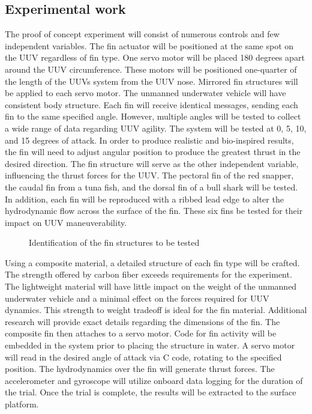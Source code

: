 \documentclass{IEEEtran}
\begin{document}
\subsection{Experimental work}
The proof of concept experiment will consist of numerous controls and few independent variables.  The fin actuator will be positioned at the same spot on the UUV regardless of fin type.  One servo motor will be placed 180 degrees apart around the UUV circumference.  These motors will be positioned one-quarter of the length of the UUVs system from the UUV nose.  Mirrored fin structures will be applied to each servo motor.  The unmanned underwater vehicle will have consistent body structure.  Each fin will receive identical messages, sending each fin to the same specified angle.  However, multiple angles will be tested to collect a wide range of data regarding UUV agility.  The system will be tested at 0, 5, 10, and 15 degrees of attack.  In order to produce realistic and bio-inspired results, the fin will need to adjust angular position to produce the greatest thrust in the desired direction.  The fin structure will serve as the other independent variable, influencing the thrust forces for the UUV.  The pectoral fin of the red snapper, the caudal fin from a tuna fish, and the dorsal fin of a bull shark will be tested.  In addition, each fin will be reproduced with a ribbed lead edge to alter the hydrodynamic flow across the surface of the fin.  These six fins be tested for their impact on UUV maneuverability.  
\begin{figure}
\caption{Identification of the fin structures to be tested}
\label{fig:5}
\end{figure}

Using a composite material, a detailed structure of each fin type will be crafted.  The strength offered by carbon fiber exceeds requirements for the experiment.  The lightweight material will have little impact on the weight of the unmanned underwater vehicle and a minimal effect on the forces required for UUV dynamics.  This strength to weight tradeoff is ideal for the fin material.  Additional research will provide exact details regarding the dimensions of the fin.  The composite fin then attaches to a servo motor.  Code for fin activity will be embedded in the system prior to placing the structure in water.  A servo motor will read in the desired angle of attack via C code, rotating to the specified position.  The hydrodynamics over the fin will generate thrust forces.  The accelerometer and gyroscope will utilize onboard data logging for the duration of the trial.  Once the trial is complete, the results will be extracted to the surface platform.  
\end{document}

